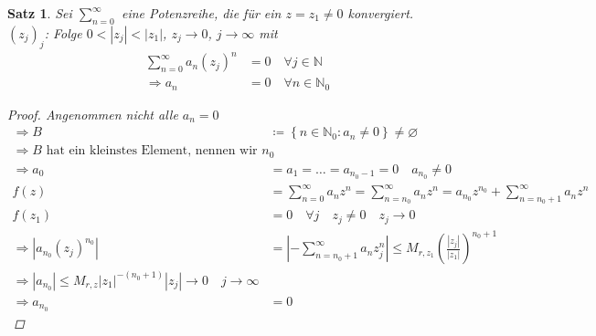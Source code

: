 \documentclass[11pt, twoside, a4paper]{article}
\theoremstyle{plain}
\newtheorem{satz}[blockelement]{Satz}
\newcommand{\set}[1]{\left\{#1\right\}}
\newcommand{\pair}[1]{\left(#1\right)}
\newcommand{\abs}[1]{\left\lvert#1\right\rvert}
\newcommand{\impl}[0]{\Rightarrow{}}
\newcommand{\fromto}{\rightarrow{}}
\newcommand{\definedas}[0]{\coloneqq}
\renewcommand{\emptyset}{\varnothing}
\newcommand{\N}{\mathbb{N}}
\begin{document}
    \begin{satz} %
        \marginnote{[18. Jan]}

        Sei $ \sum_{n=0}^{\infty}$ eine Potenzreihe, die für ein $z=z_1\neq 0$ konvergiert.\\
        $(z_j)_j$: Folge $0< \abs{z_j} < \abs{z_1}$, $z_j \fromto 0$, $j\fromto\infty$ mit
        \begin{align*}
            \sum_{n=0}^{\infty} a_n (z_j)^n &= 0\quad\forall j\in\N\\
            \impl a_n &= 0\quad\forall n\in\N_0
        \end{align*}
        \begin{proof}
            Angenommen nicht alle $a_n=0$
            \begin{align*}
                \impl B &\definedas \set{n\in\N_0: a_n \neq 0} \neq \emptyset\\
                \impl B \text{ hat ein kleinstes Element, nennen wir } n_0\\
                \impl a_0 &= a_1 = \dots = a_{n_0-1} = 0\quad a_{n_0}\neq 0\\
                f(z) &= \sum_{n=0}^{\infty} a_n z^n = \sum_{n=n_0}^{\infty} a_n z^n = a_{n_0} z^{n_0} + \sum_{n=n_0 + 1}^{\infty} a_n z^n\\
                f(z_1) &= 0\quad\forall j\quad z_j \neq 0\quad z_j\fromto 0\\
                \impl \abs{a_{n_0} (z_j)^{n_0}} &= \abs{- \sum_{n=n_0 + 1}^{\infty} a_n z_j^n} \leq M_{r, z_1} \pair{\frac{\abs{z_j}}{\abs{z_1}}}^{n_0 +1}\\
                \impl \abs{a_{n_0}} \leq M_{r,z} \abs{z_1}^{-(n_0+1)} \abs{z_j} \fromto 0\quad j\fromto\infty\\
                \impl a_{n_0} &= 0\tag{Widerspruch}
            \end{align*}
        \end{proof}
    \end{satz}
\end{document}
